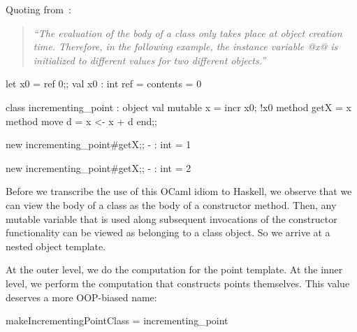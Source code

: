 Quoting from~\cite[\S\,3.1]{OCaml}:

\begin{quote}\itshape
``The evaluation of the body of a class only takes place at object
creation time.  Therefore, in the following example, the instance
variable @x@ is initialized to different values for two different
objects.''
\end{quote}

\antiskip

\begin{code}
 let x0 = ref 0;;
 val x0 : int ref = {contents = 0}
\end{code}

\begin{code}
 class incrementing_point :
   object
     val mutable x = incr x0; !x0
     method getX   = x
     method move d = x <- x + d
   end;;
\end{code}

\begin{code}
 new incrementing_point#getX;;
 - : int = 1
\end{code}

\begin{code}
 new incrementing_point#getX;;
 - : int = 2
\end{code}

\noindent
Before we transcribe the use of this OCaml idiom to Haskell, we
observe that we can view the body of a class as the body of a
constructor method. Then, any mutable variable that is used along
subsequent invocations of the constructor functionality can be viewed
as belonging to a class object. So we arrive at a nested object
template.


\noindent
At the outer level, we do the computation for the point template.  At
the inner level, we perform the computation that constructs points
themselves. This value deserves a more OOP-biased name:

\begin{code}
 makeIncrementingPointClass = incrementing_point
\end{code}


